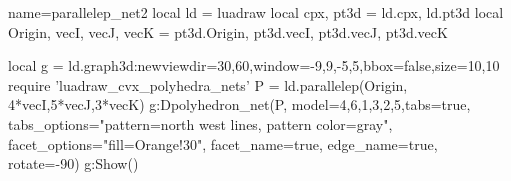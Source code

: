 \begin{luadraw}{name=parallelep_net2}
local ld = luadraw
local cpx, pt3d = ld.cpx, ld.pt3d
local Origin, vecI, vecJ, vecK = pt3d.Origin, pt3d.vecI, pt3d.vecJ, pt3d.vecK

local g = ld.graph3d:new{viewdir={30,60},window={-9,9,-5,5},bbox=false,size={10,10}}
require 'luadraw_cvx_polyhedra_nets'
P = ld.parallelep(Origin, 4*vecI,5*vecJ,3*vecK)
g:Dpolyhedron_net(P, {model={{4,6,1,3,2,5}},tabs=true, 
  tabs_options="pattern=north west lines, pattern color=gray", 
  facet_options="fill=Orange!30", facet_name=true, 
 edge_name=true, rotate=-90})
g:Show()
\end{luadraw}
